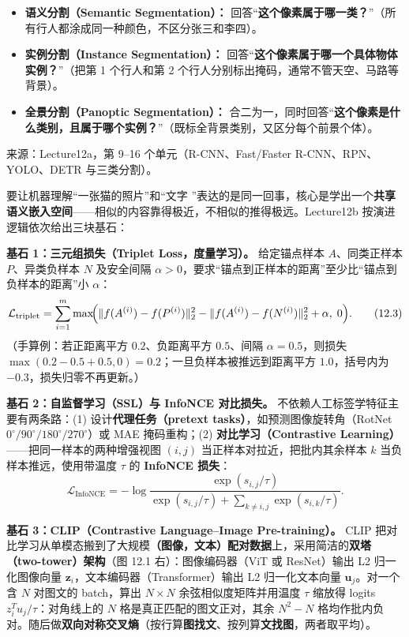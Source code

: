 
\begin{itemize}
\item \textbf{语义分割（Semantic Segmentation）：} 回答“\textbf{这个像素属于哪一类？}”（所有行人都涂成同一种颜色，不区分张三和李四）。
\item \textbf{实例分割（Instance Segmentation）：} 回答“\textbf{这个像素属于哪一个具体物体实例？}”（把第 1 个行人和第 2 个行人分别标出掩码，通常不管天空、马路等背景）。
\item \textbf{全景分割（Panoptic Segmentation）：} 合二为一，同时回答“\textbf{这个像素是什么类别，且属于哪个实例？}”（既标全背景类别，又区分每个前景个体）。
\end{itemize}

来源：Lecture12a，第 9–16 个单元（R-CNN、Fast/Faster R-CNN、RPN、YOLO、DETR 与三类分割）。



要让机器理解“一张猫的照片”和“文字 ”表达的是同一回事，核心是学出一个\textbf{共享语义嵌入空间}——相似的内容靠得极近，不相似的推得极远。Lecture12b 按演进逻辑依次给出三块基石：

\textbf{基石 1：三元组损失（Triplet Loss，度量学习）。} 给定锚点样本 $A$、同类正样本 $P$、异类负样本 $N$ 及安全间隔 $\alpha > 0$，要求“锚点到正样本的距离”至少比“锚点到负样本的距离”小 $\alpha$：
\[
\mathcal{L}_{\text{triplet}} = \sum_{i=1}^m \max\!\Bigl(\|f(A^{(i)})-f(P^{(i)})\|_2^2 - \|f(A^{(i)})-f(N^{(i)})\|_2^2 + \alpha,\; 0\Bigr).
\tag{12.3}
\]
（手算例：若正距离平方 $0.2$、负距离平方 $0.5$、间隔 $\alpha=0.5$，则损失 $\max(0.2-0.5+0.5,0)=0.2$；一旦负样本被推远到距离平方 $1.0$，括号内为 $-0.3$，损失归零不再更新。）

\textbf{基石 2：自监督学习（SSL）与 InfoNCE 对比损失。} 不依赖人工标签学特征主要有两条路：(1) 设计\textbf{代理任务（pretext tasks）}，如预测图像旋转角（RotNet $0^\circ/90^\circ/180^\circ/270^\circ$）或 MAE 掩码重构；(2) \textbf{对比学习（Contrastive Learning）}——把同一样本的两种增强视图 $(i,j)$ 当正样本对拉近，把批内其余样本 $k$ 当负样本推远，使用带温度 $\tau$ 的 \textbf{InfoNCE 损失}：
\[
\mathcal{L}_{\text{InfoNCE}} = -\log \frac{\exp(s_{i,j}/\tau)}{\exp(s_{i,j}/\tau) + \sum_{k\ne i,j}\exp(s_{i,k}/\tau)}.
\tag{12.4}
\]

\textbf{基石 3：CLIP（Contrastive Language–Image Pre-training）。} CLIP 把对比学习从单模态搬到了大规模\textbf{（图像，文本）配对数据}上，采用简洁的\textbf{双塔（two-tower）架构}（图 12.1 右）：图像编码器（ViT 或 ResNet）输出 L2 归一化图像向量 $\mathbf{z}_i$，文本编码器（Transformer）输出 L2 归一化文本向量 $\mathbf{u}_j$。对一个含 $N$ 对图文的 batch，算出 $N\times N$ 余弦相似度矩阵并用温度 $\tau$ 缩放得 logits $z_i^T u_j / \tau$：对角线上的 $N$ 格是真正匹配的图文正对，其余 $N^2-N$ 格均作批内负对。随后做\textbf{双向对称交叉熵}（按行算\textbf{图找文}、按列算\textbf{文找图}，两者取平均）。

